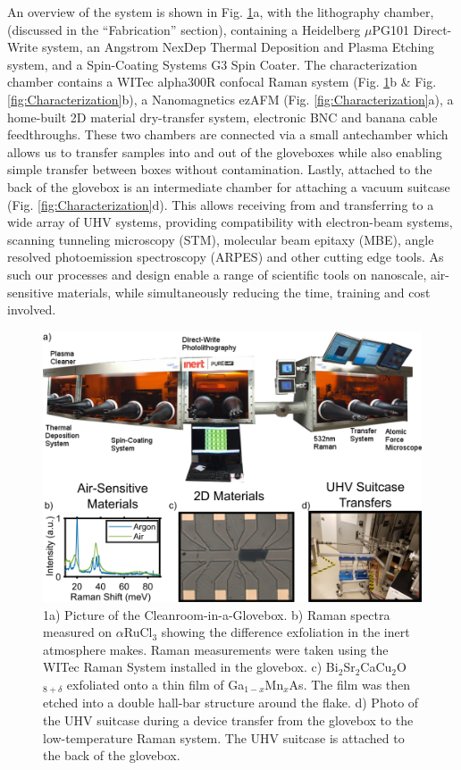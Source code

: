 An overview of the system is shown in Fig. \ref{fig:Overview}a, with the lithography chamber, (discussed in the ``Fabrication'' section), containing a Heidelberg $\mu$PG101 Direct-Write system, an Angstrom NexDep Thermal Deposition and Plasma Etching system, and a Spin-Coating Systems G3 Spin Coater. The characterization chamber contains a WITec alpha300R confocal Raman system (Fig. \ref{fig:Overview}b \& Fig. \ref{fig:Characterization}b), a Nanomagnetics ezAFM (Fig. \ref{fig:Characterization}a), a home-built 2D material dry-transfer system, electronic BNC and banana cable feedthroughs. These two chambers are connected via a small antechamber which allows us to transfer samples into and out of the gloveboxes while also enabling simple transfer between boxes without contamination. Lastly, attached to the back of the glovebox is an intermediate chamber for attaching a vacuum suitcase (Fig. \ref{fig:Characterization}d). This allows receiving from and transferring to a wide array of UHV systems, providing compatibility with electron-beam systems, 
scanning tunneling microscopy (STM), molecular beam epitaxy (MBE), angle resolved photoemission spectroscopy (ARPES) and other cutting edge tools. As such our processes and design enable a range of scientific tools on nanoscale, air-sensitive materials, while simultaneously reducing the time, training and cost involved.    

\begin{figure}
    \centering
    \includegraphics[width=\textwidth]{Chap2/Figures/IntroductionFigure.png}
    \caption{1a) Picture of the Cleanroom-in-a-Glovebox. b) Raman spectra measured on $\alpha$RuCl$_{3}$ showing the difference exfoliation in the inert atmosphere makes. Raman measurements were taken using the WITec Raman System installed in the glovebox. c) Bi$_{2}$Sr$_{2}$CaCu$_{2}$O$_{8+\delta}$ exfoliated onto a thin film of Ga$_{1-x}$Mn$_{x}$As. The film was then etched into a double hall-bar structure around the flake. d) Photo of the UHV suitcase during a device transfer from the glovebox to the low-temperature Raman system. The UHV suitcase is attached to the back of the glovebox.}
    \label{fig:Overview}
\end{figure}

